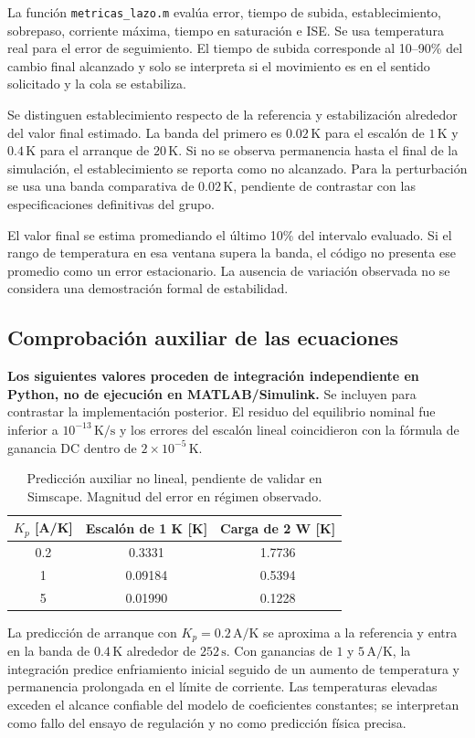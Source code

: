 La función \texttt{metricas\_lazo.m} evalúa error, tiempo de subida, establecimiento, sobrepaso, corriente máxima, tiempo en saturación e ISE. Se usa temperatura real para el error de seguimiento. El tiempo de subida corresponde al 10--90\% del cambio final alcanzado y solo se interpreta si el movimiento es en el sentido solicitado y la cola se estabiliza.

Se distinguen establecimiento respecto de la referencia y estabilización alrededor del valor final estimado. La banda del primero es $0.02\,\mathrm K$ para el escalón de $1\,\mathrm K$ y $0.4\,\mathrm K$ para el arranque de $20\,\mathrm K$. Si no se observa permanencia hasta el final de la simulación, el establecimiento se reporta como no alcanzado. Para la perturbación se usa una banda comparativa de $0.02\,\mathrm K$, pendiente de contrastar con las especificaciones definitivas del grupo.

El valor final se estima promediando el último 10\% del intervalo evaluado. Si el rango de temperatura en esa ventana supera la banda, el código no presenta ese promedio como un error estacionario. La ausencia de variación observada no se considera una demostración formal de estabilidad.

\subsection{Comprobación auxiliar de las ecuaciones}
\textbf{Los siguientes valores proceden de integración independiente en Python, no de ejecución en MATLAB/Simulink.} Se incluyen para contrastar la implementación posterior. El residuo del equilibrio nominal fue inferior a $10^{-13}\,\mathrm{K/s}$ y los errores del escalón lineal coincidieron con la fórmula de ganancia DC dentro de $2\times10^{-5}\,\mathrm K$.

\begin{table}[!tbp]\centering
\caption{Predicción auxiliar no lineal, pendiente de validar en Simscape. Magnitud del error en régimen observado.}
\label{tab:auxiliarP}
\footnotesize
\begin{tabular}{@{}ccc@{}}\toprule
$K_p$ [A/K]&Escalón de 1 K [K]&Carga de 2 W [K]\\\midrule
0.2&0.3331&1.7736\\
1&0.09184&0.5394\\
5&0.01990&0.1228\\\bottomrule
\end{tabular}
\end{table}
La predicción de arranque con $K_p=0.2\,\mathrm{A/K}$ se aproxima a la referencia y entra en la banda de $0.4\,\mathrm K$ alrededor de $252\,\mathrm s$. Con ganancias de $1$ y $5\,\mathrm{A/K}$, la integración predice enfriamiento inicial seguido de un aumento de temperatura y permanencia prolongada en el límite de corriente. Las temperaturas elevadas exceden el alcance confiable del modelo de coeficientes constantes; se interpretan como fallo del ensayo de regulación y no como predicción física precisa.

